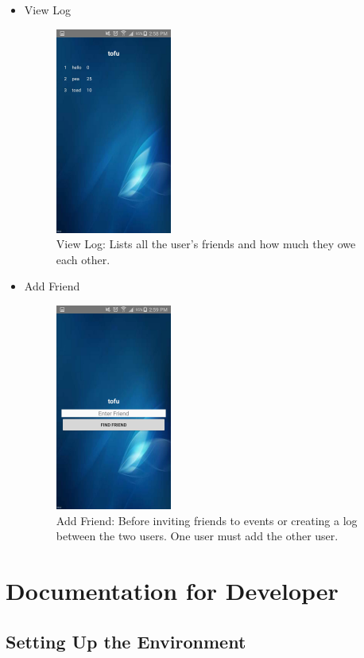\documentclass[12pt]{article}
\begin{document}
\begin{itemize}
\begin{figure}[H]
        \label{view_events}
    \end{figure} 
    \newpage
\item View Log
    \begin{figure}[H]
        \centering
        \includegraphics[width=1.5in]{view_log.jpg}
        \caption{View Log: Lists all the user's friends and how much they owe each other.}
        \label{view_log}
    \end{figure} 
\item Add Friend
    \begin{figure}[H]
        \centering
        \includegraphics[width=1.5in]{add_friend.jpg}
        \caption{Add Friend: Before inviting friends to events or creating a log between the two users. One
        user must add the other user.}
        \label{add_friend}
    \end{figure} 
\end{itemize}



\section{Documentation for Developer}

\subsection{Setting Up the Environment}
\end{document}
